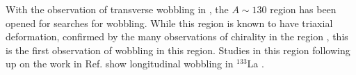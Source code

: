 With the observation of transverse wobbling in \pr{}, the $A\sim{}130$ region has been opened for searches for wobbling. While this region is known to have triaxial deformation, confirmed by the many observations of chirality in the region \cite{chiralityIn135Nd,wobblingIn134Pr,chiralityA130Region,chiralityA130Region2,chiralityUpperA130Region,chirality136Pm,chiralityMore135Nd,chiralityMulti133Cs}, this is the first observation of wobbling in this region. Studies in this region following up on the work in Ref. \cite{mattaTransversePRL} show longitudinal wobbling in $^{133}$La \cite{palitLongWobbling}.

